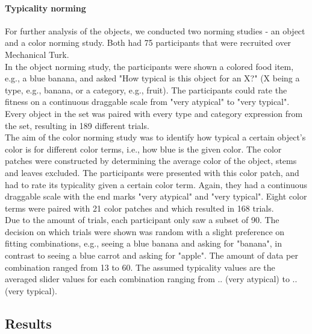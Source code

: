 \documentclass[10pt,letterpaper]{article}
\begin{document}
\paragraph{Typicality norming}
For further analysis of the objects, we conducted two norming studies - an object and a color norming study. Both had 75 participants that were recruited over Mechanical Turk.\\
In the object norming study, the participants were shown a colored food item, e.g., a blue banana, and asked "How typical is this object for an X?" (X being a type, e.g., banana, or a category, e.g., fruit). The participants could rate the fitness on a continuous draggable scale from "very atypical" to "very typical". Every object in the set was paired with every type and category expression from the set, resulting in 189 different trials.\\ 
The aim of the color norming study was to identify how typical a certain object's color is for different color terms, i.e., how blue is the given color. The color patches were constructed by determining the average color of the object, stems and leaves excluded. The participants were presented with this color patch, and had to rate its typicality given a certain color term. Again, they had a continuous draggable scale with the end marks "very atypical" and "very typical". Eight color terms were paired with 21 color patches and which resulted in 168 trials.\\
Due to the amount of trials, each participant only saw a subset of 90. The decision on which trials were shown was random with a slight preference on fitting combinations, e.g., seeing a blue banana and asking for "banana", in contrast to seeing a blue carrot and asking for "apple". The amount of data per combination ranged from 13 to 60. The assumed typicality values are the averaged slider values for each combination ranging from .. (very atypical) to .. (very typical). 

\subsection{\bf Results}
\end{document}
